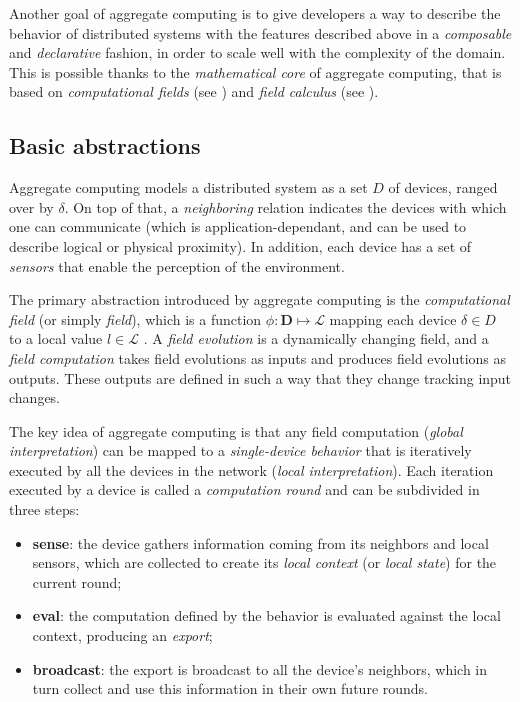 Another goal of aggregate computing is to give developers a way to describe the behavior of distributed systems with the features described above in a \textit{composable} and \textit{declarative} fashion, in order to scale well with the complexity of the domain.
%
This is possible thanks to the \textit{mathematical core} of aggregate computing, that is based on \textit{computational fields} (see ) and \textit{field calculus} (see ).

\subsection{Basic abstractions}
\label{sec:ac-abstractions}

Aggregate computing models a distributed system as a set $D$ of devices, ranged over by $\delta$.
%
On top of that, a \textit{neighboring} relation indicates the devices with which one can communicate (which is application-dependant, and can be used to describe logical or physical proximity).
%
In addition, each device has a set of \textit{sensors} that enable the perception of the environment.

The primary abstraction introduced by aggregate computing is the \textit{computational field} (or simply \textit{field}), which is a function $\phi : \mathbf{D} \mapsto \mathcal{L}$ mapping each device $\delta \in D$ to a local value $l \in \mathcal{L}$ \cite{10.1145/3177774}.
%
A \textit{field evolution} is a dynamically changing field, and a \textit{field computation} takes field evolutions as inputs and produces field evolutions as outputs.
%
These outputs are defined in such a way that they change tracking input changes.

The key idea of aggregate computing is that any field computation (\textit{global interpretation}) can be mapped to a \textit{single-device behavior} that is iteratively executed by all the devices in the network (\textit{local interpretation}).
%
Each iteration executed by a device is called a \textit{computation round} and can be subdivided in three steps:
%
\begin{itemize}
    \item \textbf{sense}: the device gathers information coming from its neighbors and local sensors, which are collected to create its \textit{local context} (or \textit{local state}) for the current round;
    \item \textbf{eval}: the computation defined by the behavior is evaluated against the local context, producing an \textit{export};
    \item \textbf{broadcast}: the export is broadcast to all the device's neighbors, which in turn collect and use this information in their own future rounds.
\end{itemize}

